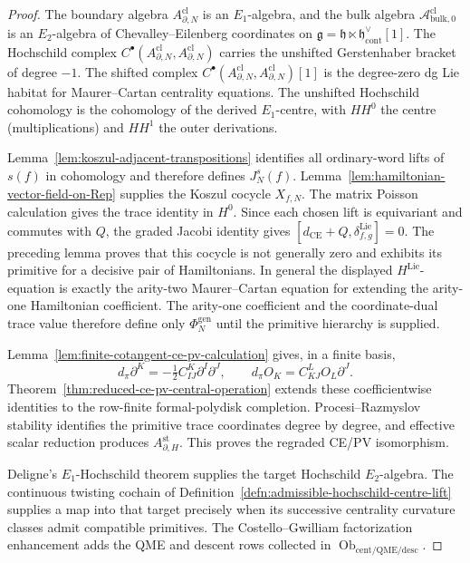 \documentclass[11pt]{memoir}
\begin{document}
\begin{proof}
  The boundary algebra \(A^{\mathrm{cl}}_{\partial,N}\) is an
  \(E_1\)-algebra, and the bulk algebra
  \(\mathcal A^{\mathrm{cl}}_{\mathrm{bulk},0}\) is an
  \(E_2\)-algebra of Chevalley--Eilenberg coordinates on
  \(\mathfrak g=\mathfrak h\ltimes\mathfrak h^\vee_{\mathrm{cont}}[1]\).
  The Hochschild complex
  \(C^\bullet(A^{\mathrm{cl}}_{\partial,N},A^{\mathrm{cl}}_{\partial,N})\)
  carries the unshifted Gerstenhaber bracket of degree \(-1\).  The
  shifted complex
  \(C^\bullet(A^{\mathrm{cl}}_{\partial,N},A^{\mathrm{cl}}_{\partial,N})[1]\)
  is the degree-zero dg Lie habitat for Maurer--Cartan centrality
  equations.  The unshifted Hochschild cohomology is the cohomology of
  the derived \(E_1\)-centre, with \(HH^0\) the centre
  (multiplications) and \(HH^1\) the outer derivations.

  Lemma~\ref{lem:koszul-adjacent-transpositions} identifies all
  ordinary-word lifts of \(s(f)\) in cohomology and therefore defines
  \(J_N^s(f)\).  Lemma~\ref{lem:hamiltonian-vector-field-on-Rep}
  supplies the Koszul cocycle \(X_{f,N}\).  The matrix Poisson
  calculation gives the trace identity in \(H^0\).  Since each chosen
  lift is equivariant and commutes with \(Q\), the graded Jacobi
  identity gives
  \([d_{\mathrm{CE}}+Q,\delta^{\mathrm{Lie}}_{f,g}]=0\).  The preceding
  lemma proves that
  this cocycle is not generally zero and exhibits its primitive for a
  decisive pair of Hamiltonians.  In general the displayed
  \(H^{\mathrm{Lie}}\)-equation is exactly the arity-two
  Maurer--Cartan equation for extending the arity-one Hamiltonian
  coefficient.  The arity-one coefficient and the coordinate-dual trace
  value therefore define only \(\Phi_N^{\mathrm{gen}}\) until the
  primitive hierarchy is supplied.

  Lemma~\ref{lem:finite-cotangent-ce-pv-calculation} gives, in a finite
  basis,
  \[
    d_\pi\partial^K=-\tfrac12 C^K_{IJ}\partial^I\partial^J,
    \qquad
    d_\pi O_K=C^L_{KJ}O_L\partial^J.
  \]
  Theorem~\ref{thm:reduced-ce-pv-central-operation} extends these
  coefficientwise identities to the row-finite formal-polydisk
  completion.  Procesi--Razmyslov stability identifies the primitive
  trace coordinates degree by degree, and effective scalar reduction
  produces \(A_{\partial,H}^{\mathrm{st}}\).  This proves the regraded
  CE/PV isomorphism.

  Deligne's \(E_1\)-Hochschild theorem supplies the target
  Hochschild \(E_2\)-algebra.  The continuous twisting cochain of
  Definition~\ref{defn:admissible-hochschild-centre-lift} supplies a map
  into that target precisely when its successive centrality curvature
  classes admit compatible primitives.  The Costello--Gwilliam
  factorization enhancement adds the QME and descent rows collected in
  \(\operatorname{Ob}_{\mathrm{cent/QME/desc}}\).
\end{proof}
\end{document}

